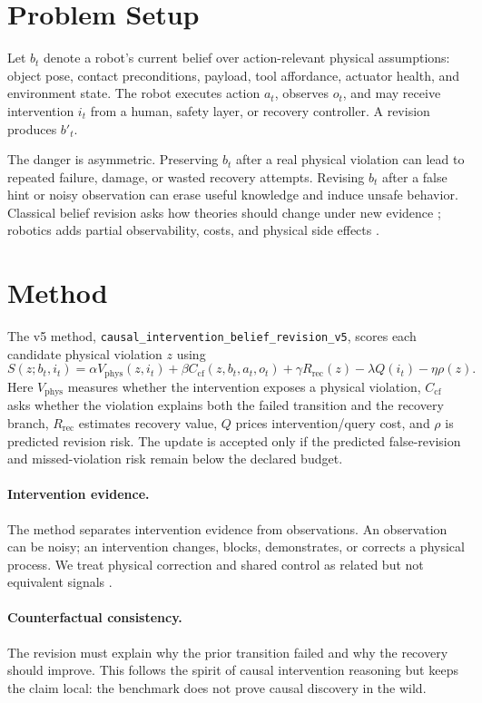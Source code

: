 \documentclass{article}
\begin{document}
\section{Problem Setup}
Let $b_t$ denote a robot's current belief over action-relevant physical assumptions: object pose, contact preconditions, payload, tool affordance, actuator health, and environment state. The robot executes action $a_t$, observes $o_t$, and may receive intervention $i_t$ from a human, safety layer, or recovery controller. A revision produces $b'_t$.

The danger is asymmetric. Preserving $b_t$ after a real physical violation can lead to repeated failure, damage, or wasted recovery attempts. Revising $b_t$ after a false hint or noisy observation can erase useful knowledge and induce unsafe behavior. Classical belief revision asks how theories should change under new evidence \citep{agm1985}; robotics adds partial observability, costs, and physical side effects \citep{thrun2005probabilistic,garcia2015safe}.

\section{Method}
The v5 method, \texttt{causal\_intervention\_belief\_revision\_v5}, scores each candidate physical violation $z$ using
\[
S(z;b_t,i_t)=
\alpha V_\mathrm{phys}(z,i_t)+
\beta C_\mathrm{cf}(z,b_t,a_t,o_t)+
\gamma R_\mathrm{rec}(z)-
\lambda Q(i_t)-
\eta \rho(z).
\]
Here $V_\mathrm{phys}$ measures whether the intervention exposes a physical violation, $C_\mathrm{cf}$ asks whether the violation explains both the failed transition and the recovery branch, $R_\mathrm{rec}$ estimates recovery value, $Q$ prices intervention/query cost, and $\rho$ is predicted revision risk. The update is accepted only if the predicted false-revision and missed-violation risk remain below the declared budget.

\paragraph{Intervention evidence.}
The method separates intervention evidence from observations. An observation can be noisy; an intervention changes, blocks, demonstrates, or corrects a physical process. We treat physical correction and shared control as related but not equivalent signals \citep{bajcsy2017corrections,dragan2013policy,hadfield2016cirl}.

\paragraph{Counterfactual consistency.}
The revision must explain why the prior transition failed and why the recovery should improve. This follows the spirit of causal intervention reasoning \citep{pearl2009causality} but keeps the claim local: the benchmark does not prove causal discovery in the wild.
\end{document}
